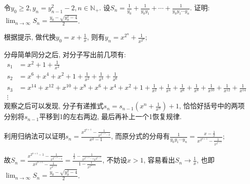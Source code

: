      \begin{exercise}
         令$y_0 \geqslant 2, y_n=y_{n-1}^2-2, n \in \mathbb{N}_+$. 设$S_n=\frac{1}{y_0}+\frac{1}{y_0y_1}+\cdots+\frac{1}{y_0y_1\cdots y_n}$. 证明: $\lim_{n\to\infty}S_n=\frac{y_0-\sqrt{y_0^2-4}}{2}$.
     \end{exercise}
     \begin{solution}
         根据提示, 做代换$y_0=x+\frac{1}{x}$, 则有$y_n=x^{2^n}+\frac{1}{x^{2^n}}$;

         分母简单同分之后, 对分子写出前几项有:
         \begin{align*}
             s_1 & =x^2+1+\frac{1}{x^2}                                                                                                                               \\
             s_2 & =x^6+x^4+x^2+1+\frac{1}{x^2}+\frac{1}{x^4}+\frac{1}{x^6}                                                                                           \\
             s_3 & =x^{14}+x^{12}+x^{10}+x^8+x^6+x^4+x^2+1+\frac{1}{x^2}+\frac{1}{x^4}+\frac{1}{x^6}+\frac{1}{x^8}+\frac{1}{x^{10}}+\frac{1}{x^{12}}+\frac{1}{x^{14}} \\
             \vdots
         \end{align*}
         观察之后可以发现, 分子有递推式$s_n=s_{n-1}(x^n+\frac{1}{x^n})+1$, 恰恰好括号中的两项分别将$s_{n-1}$平移到1的左右两边, 最后再补上一个1恢复规律.

    利用归纳法可以证明$s_n=\frac{x^{2^{n+1}}-\frac{1}{x^{2^{n+1}-2}}}{x^2-1}$, 而原分式的分母有$\frac{1}{y_0y_1\cdots y_n}=\frac{x-\frac{1}{x}}{x^{2^{n+1}}-\frac{1}{x^{2^{n+1}}}}$;

    故$S_n=\frac{x^{2^{n+1}-1}-\frac{1}{x^{2^{n+1}-1}}}{x^{2^{n+1}}-\frac{1}{x^{2^{n+1}}}}=\frac{\frac{1}{x}-\frac{1}{x^{2^{n+1}-1}x^{2^{n+1}}}}{1-\frac{1}{x^{2^{2n+2}}}}$, 不妨设$x>1$, 容易看出$S_n\to \frac{1}{x}$, 也即$\lim_{n\to\infty}S_n=\frac{y_0-\sqrt{y_0^2-4}}{2}$.
     \end{solution}

